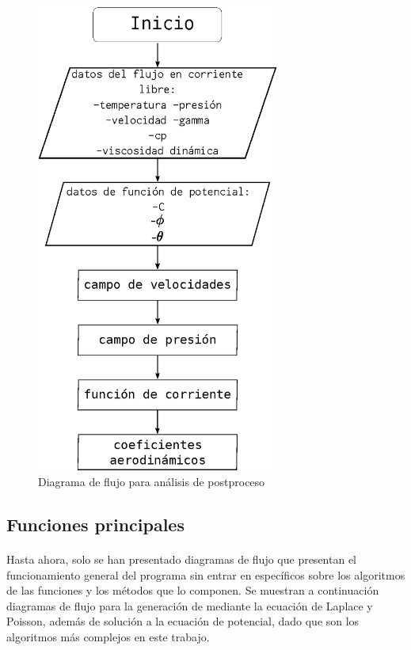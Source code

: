 \documentclass[letterpaper, openright, 12pt]{book}
\begin{document}
    \begin{figure}[htbp!]
        \centering
        \includegraphics[keepaspectratio, width=80mm]{./Imagenes/flujo_potencial_after}
        \caption{Diagrama de flujo para análisis de postproceso}
        \label{flujo_potencial_after}
    \end{figure}

    \subsection{Funciones principales}
    \paragraph*{}
        Hasta ahora, solo se han presentado diagramas de flujo que presentan el
        funcionamiento general del programa sin entrar en específicos sobre los
        algoritmos de las funciones y los métodos que lo componen. Se muestran a
        continuación diagramas de flujo para la generación de mediante la
        ecuación de Laplace y Poisson, además de solución a la ecuación de
        potencial, dado que son los algoritmos más complejos en este trabajo.
\end{document}
